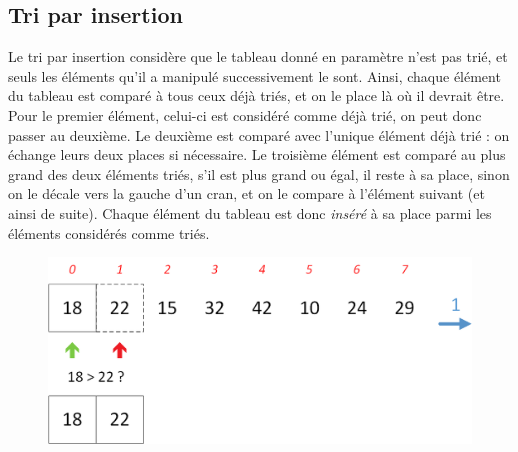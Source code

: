 \documentclass[11pt,a4paper]{article}
\begin{document}
\bigskip


\vfillLast

\clearpage

\subsection{Tri par insertion}

Le tri par insertion considère que le tableau donné en paramètre n'est pas trié, et seuls les éléments qu'il a manipulé successivement le sont.
Ainsi, chaque élément du tableau est comparé à tous ceux déjà triés, et on le place là où il devrait être.
Pour le premier élément, celui-ci est considéré comme déjà trié, on peut donc passer au deuxième.
Le deuxième est comparé avec l'unique élément déjà trié : on échange leurs deux places si nécessaire.
Le troisième élément est comparé au plus grand des deux éléments triés, s'il est plus grand ou égal, il reste à sa place, sinon on le décale vers la gauche d'un cran, et on le compare à l'élément suivant (et ainsi de suite).
Chaque élément du tableau est donc \textit{inséré} à sa place parmi les éléments considérés comme triés.

\begin{figure}[ht!]
\centering
\centerline{
\includegraphics[scale=0.48]{img/InsertionSort_part1_1.png}
}
\end{figure}
\end{document}
